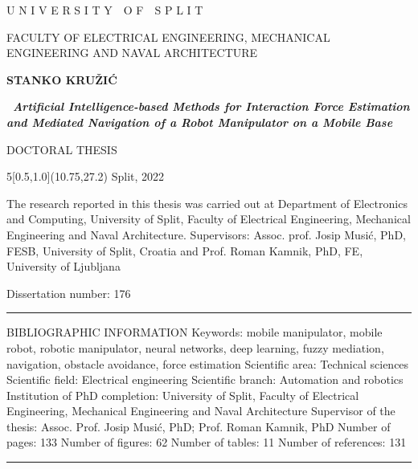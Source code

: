 \documentclass[12pt, twoside, onecolumn]{book}
\DeclareRobustCommand{\[}{\begin{equation}}
\DeclareRobustCommand{\]}{\end{equation}}
\begin{document}
\begin{titlepage}
\begin{center}
{\fontsize{13}{20}\textnormal{U N I V E R S I T Y~~O F~~S P L I T}}
	
{\fontsize{13}{20}\textnormal{FACULTY OF ELECTRICAL ENGINEERING, MECHANICAL ENGINEERING AND NAVAL ARCHITECTURE}}

\vskip 54mm
{\fontsize{14}{20}\bfseries{STANKO KRUŽIĆ}}

\vskip 18mm
{\fontsize{18}{18}\bfseries\
\emph{Artificial Intelligence-based Methods for Interaction Force Estimation and Mediated Navigation of a Robot Manipulator on a Mobile Base}}
	
\vskip 20mm
{\fontsize{14}{20}\textnormal{DOCTORAL THESIS}}

\begin{textblock}{5}[0.5,1.0](10.75,27.2)
{\fontsize{13}{20}\textnormal
Split, 2022}
\end{textblock}

\end{center}
\newpage
		
\begin{flushleft}
\textnormal{}

The research reported in this thesis was carried out at Department of Electronics and Computing, University of Split, Faculty of Electrical Engineering, Mechanical Engineering and Naval Architecture.
\vskip 12mm
Supervisors: Assoc. prof. Josip Musić, PhD, FESB, University of Split, Croatia and Prof. Roman Kamnik, PhD, FE, University of Ljubljana

Dissertation number: 176

\vskip 40mm
\rule{16cm}{1.4pt}
\vskip 2mm
\addtolength{\leftskip}{5mm}\textnormal{BIBLIOGRAPHIC INFORMATION}
\vskip 2mm
\textnormal{Keywords: mobile manipulator, mobile robot, robotic manipulator, neural networks, deep learning, fuzzy mediation, navigation, obstacle avoidance, force estimation}
\vskip 0mm
\textnormal{Scientific area: Technical sciences}
\vskip 0mm
\textnormal{Scientific field: Electrical engineering}
\vskip 0mm
\textnormal{Scientific branch: Automation and robotics}
\vskip 0mm
\textnormal{Institution of PhD completion: University of Split, Faculty of Electrical Engineering, Mechanical Engineering and Naval Architecture}
\vskip 0mm
\textnormal{Supervisor of the thesis: Assoc. Prof. Josip Musić, PhD; Prof. Roman Kamnik, PhD}
\vskip 0mm
\textnormal{Number of pages: 133}
\vskip 0mm
\textnormal{Number of figures: 62}
\vskip 0mm
\textnormal{Number of tables: 11}
\vskip 0mm
\textnormal{Number of references: 131}
\vskip 0mm
\rule{16cm}{1.4pt}
\addtolength{\leftskip}{-5mm}


\end{flushleft}
\end{titlepage}
\end{document}
